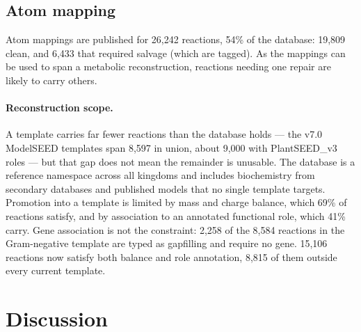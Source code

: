\documentclass[unnumsec,webpdf,modern,large]{oup-authoring-template}
\begin{document}
\subsection{Atom mapping}\label{sec:results-mapping}

Atom mappings are published for 26,242 reactions, 54\% of the database: 19,809 clean, and 6,433 that required salvage (which are tagged). As the mappings can be used to span a metabolic reconstruction, reactions needing one repair are likely to carry others.

\paragraph{Reconstruction scope.} A template carries far fewer reactions than the database holds --- the v7.0 ModelSEED templates span 8,597 in union, about 9,000 with PlantSEED\_v3 roles --- but that gap does not mean the remainder is unusable. The database is a reference namespace across all kingdoms and includes biochemistry from secondary databases and published models that no single template targets. Promotion into a template is limited by mass and charge balance, which 69\% of reactions satisfy, and by association to an annotated functional role, which 41\% carry. Gene association is not the constraint: 2,258 of the 8,584 reactions in the Gram-negative template are typed as gapfilling and require no gene. 15,106 reactions now satisfy both balance and role annotation, 8,815 of them outside every current template.


\section{Discussion}
\end{document}
